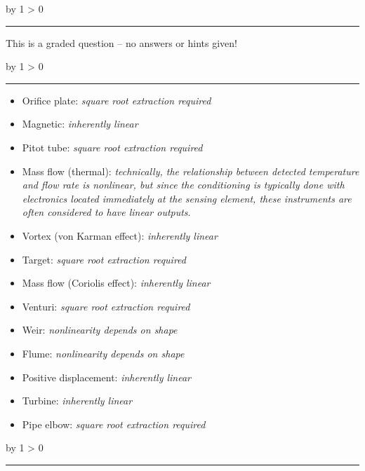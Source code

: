 \documentclass[12pt,a4paper]{article}
\def\oppgave{
            \advance\questnum by 1
            \ifnum \questnum > 0
                 \hrule
                 \vskip 3pt
                 \leftline{Oppgave \the\questnum}
                 \vskip 3pt \fi}
\def\svar{
           \advance\answnum by 1
           \ifnum \answnum > 0
                \hrule
                \vskip 3pt
                \leftline{Svar \the\answnum}
                \vskip 3pt \fi}
\def\notes{
           \advance\explnum by 1
           \ifnum \explnum > 0
                \hrule
                \vskip 3pt
                \leftline{Notes \the\explnum}
                \vskip 3pt \fi}
\begin{document}
\vfil

\eject
\vskip 10pt \filbreak 





\svar{} 

This is a graded question -- no answers or hints given!

\vskip 10pt \filbreak 





\notes{} 

\begin{itemize}
\item{} Orifice plate: {\it square root extraction required}
\vskip 5pt
\item{} Magnetic: {\it inherently linear}
\vskip 5pt
\item{} Pitot tube: {\it square root extraction required}
\vskip 5pt
\item{} Mass flow (thermal): {\it technically, the relationship between detected temperature and flow rate is nonlinear, but since the conditioning is typically done with electronics located immediately at the sensing element, these instruments are often considered to have linear outputs}.
\vskip 5pt
\item{} Vortex (von Karman effect): {\it inherently linear}
\vskip 5pt
\item{} Target: {\it square root extraction required}
\vskip 5pt
\item{} Mass flow (Coriolis effect): {\it inherently linear}
\vskip 5pt
\item{} Venturi: {\it square root extraction required}
\vskip 5pt
\item{} Weir: {\it nonlinearity depends on shape}
\vskip 5pt
\item{} Flume: {\it nonlinearity depends on shape}
\vskip 5pt
\item{} Positive displacement: {\it inherently linear}
\vskip 5pt
\item{} Turbine: {\it inherently linear}
\vskip 5pt
\item{} Pipe elbow: {\it square root extraction required}
\end{itemize}


\vfil \eject 



\oppgave{} 
\end{document}
